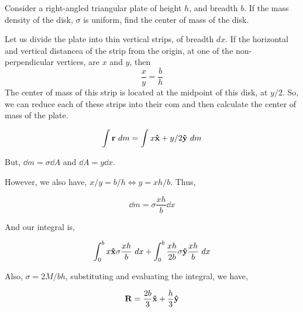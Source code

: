 \begin{example}
    Consider a right-angled triangular plate of height \(h\), and breadth \(b\). If the mass density 
    of the disk, \(\sigma\) is uniform, find the center of mass of the disk.


    \begin{soln}
        Let us divide the plate into thin vertical strips, of breadth \(dx\). If the horizontal and vertical distancea of 
        the strip from the origin, at one of the non-perpendicular vertices, are \(x\) and \(y\), then
        \begin{equation*}
            \frac{x}{y} = \frac{b}{h}
        \end{equation*} 
        The center of mass of this strip is located at the midpoint of this disk, at \(y/2\).
        So, we can reduce each of these strips into their com and then calculate the center of mass of the plate.

        \begin{equation*}
            \int \boldsymbol{\mathbf{r}} \mathop{}{d}{m} = \int x \boldsymbol{\mathbf{\hat{x}}} + y/2 \boldsymbol{\mathbf{\hat{y}}} \mathop{}{d}{m}
        \end{equation*}

        But, \(\dd{m} = \sigma \dd{A}\) and \(\dd{A} = y \dd{x}\). 

        However, we also have, \(x/y = b/h \iff y = xh/b\). Thus, 

        \begin{equation*}
            \dd{m} = \sigma \frac{xh}{b} \dd{x}
        \end{equation*}

        And our integral is,

        \begin{equation*}
            \int_{0}^{b} x \boldsymbol{\mathbf{\hat{x}}} \sigma \frac{xh}{b} \mathop{}{d}{x}+ \int_{0}^b \frac{xh}{2b} \sigma \boldsymbol{\mathbf{\hat{y}}} \frac{xh}{b} \mathop{}{d}{x}
        \end{equation*}

        Also, \(\sigma = 2M/bh\), substituting and evaluating the integral, we have,

        \begin{equation}
            \boldsymbol{\mathbf{R}} = \frac{2b}{3} \boldsymbol{\mathbf{\hat{x}}} + \frac{h}{3} \boldsymbol{\mathbf{\hat{y}}}
        \end{equation}

    \end{soln}
\end{example}

